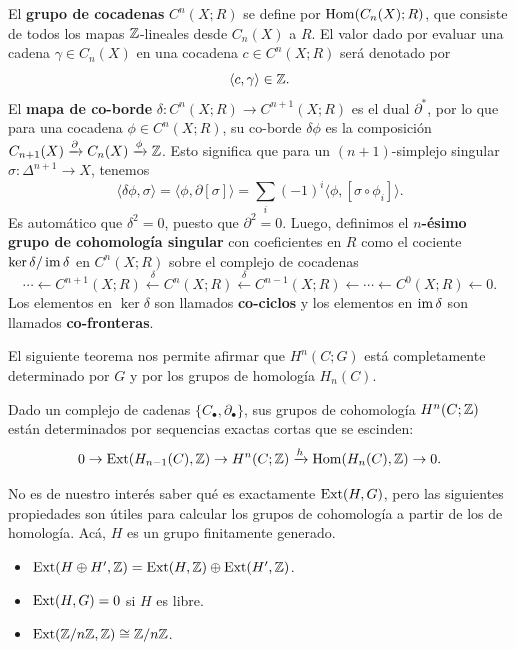 \begin{definition}
	El \textbf{grupo de cocadenas} $C^{n}(X;R)$ se define por $\operatorname{Hom}(C_{n}(X); R)$, que consiste de todos los mapas $\mathbb{Z}$-lineales desde $C_{n}(X)$ a $R$. El valor dado por evaluar una cadena $\gamma \in C_{n}(X)$ en una cocadena $c \in C^{n}(X;R)$ será denotado por 
	\[ \langle c,\gamma \rangle \in \mathbb{Z}. \]
	El \textbf{mapa de co-borde} $\delta \colon C^{n}(X;R) \to C^{n+1}(X;R)$ es el dual $\partial^{*}$, por lo que para una cocadena $\phi \in C^{n}(X;R)$, su co-borde $\delta \phi$ es la composición $C_{n+1}(X) \xrightarrow{\partial} C_{n}(X) \xrightarrow{\phi} \mathbb{Z}$. Esto significa que para un $(n+1)$-simplejo singular $\sigma \colon \Delta^{n+1} \to X$, tenemos
	\[ \langle \delta \phi, \sigma \rangle = \langle \phi, \partial [\sigma] \rangle = \sum_{i} (-1)^{i} \langle \phi, [\sigma \circ \phi_{i}] \rangle. \]
	Es automático que $\delta^{2} = 0$, puesto que $\partial^{2} = 0$. Luego, definimos el \textbf{$n$-ésimo grupo de cohomología singular} con coeficientes en $R$ como el cociente $\ker \delta \slash \operatorname{im} \delta$ en $C^{n}(X;R)$ sobre el complejo de cocadenas
	\[ \cdots \leftarrow C^{n+1}(X;R) \xleftarrow{\delta} C^{n}(X;R) \xleftarrow{\delta} C^{n-1}(X;R) \leftarrow \cdots \leftarrow C^{0}(X;R) \leftarrow 0. \]
	Los elementos en $\ker \delta$ son llamados \textbf{co-ciclos} y los elementos en $\operatorname{im} \delta$ son llamados \textbf{co-fronteras}.
\end{definition}

El siguiente teorema nos permite afirmar que $H^{n}(C;G)$ está completamente determinado por $G$ y por los grupos de homología $H_{n}(C)$.

\begin{theorem}
	Dado un complejo de cadenas $\{ C_{\bullet}, \partial_{\bullet} \}$, sus grupos de cohomología $H^{n}(C;\mathbb{Z})$ están determinados por sequencias exactas cortas que se escinden:
	\[ 0 \to \operatorname{Ext}(H_{n-1}(C), \mathbb{Z}) \to H^{n}(C; \mathbb{Z}) \xrightarrow{h} \operatorname{Hom}(H_{n}(C), \mathbb{Z}) \to 0. \]
\end{theorem}

No es de nuestro interés saber qué es exactamente $\operatorname{Ext}(H,G)$, pero las siguientes propiedades son útiles para calcular los grupos de cohomología a partir de los de homología. Acá, $H$ es un grupo finitamente generado.
\begin{itemize}
	\item $\operatorname{Ext}(H \oplus H', \mathbb{Z}) = \operatorname{Ext}(H,\mathbb{Z}) \oplus \operatorname{Ext}(H',\mathbb{Z})$.

	\item $\operatorname{Ext}(H,G) = 0$ si $H$ es libre.

	\item $\operatorname{Ext}(\mathbb{Z} \slash n\mathbb{Z}, \mathbb{Z}) \cong \mathbb{Z} \slash n\mathbb{Z}$.
\end{itemize}

